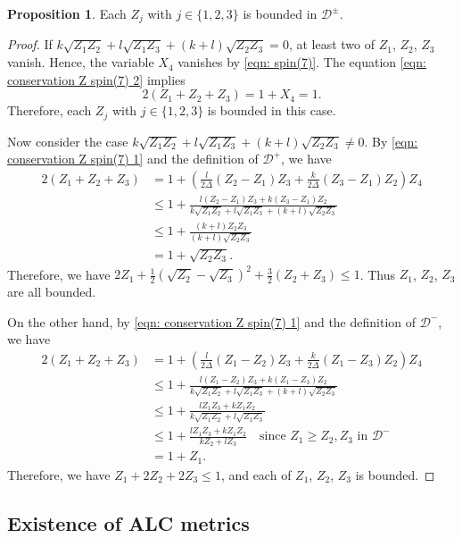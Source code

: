 \documentclass[11pt,letterpaper]{amsart}
\theoremstyle{definition}
\newtheorem{proposition}[theorem]{Proposition}
\numberwithin{equation}{section}
\begin{document}
\begin{proposition}
\label{prop: bounded Z1Z2Z3}
Each $Z_j$ with $j\in\{1,2,3\}$ is bounded in $\mathcal{D}^\pm$. 
\end{proposition}
\begin{proof}
If $k\sqrt{Z_1Z_2}+l\sqrt{Z_1Z_3}+(k+l)\sqrt{Z_2Z_3}=0$, at least two of $Z_1$, $Z_2$, $Z_3$ vanish. Hence, the variable $X_4$ vanishes by \eqref{eqn: spin(7)}. The equation \eqref{eqn: conservation Z spin(7) 2} implies
$$2(Z_1+Z_2+Z_3)=1+X_4=1.
$$
Therefore, each $Z_j$ with $j\in\{1,2,3\}$ is bounded in this case.

Now consider the case $k\sqrt{Z_1Z_2}+l\sqrt{Z_1Z_3}+(k+l)\sqrt{Z_2Z_3}\neq 0$.
By \eqref{eqn: conservation Z spin(7) 1} and the definition of $\mathcal{D}^+$, we have
\begin{equation}
\begin{split}
2(Z_1+Z_2+Z_3)&=1+\left(\frac{l}{2\Delta}(Z_2-Z_1)Z_3+\frac{k}{2\Delta}(Z_3-Z_1)Z_2\right)Z_4\\
&\leq 1+\frac{l(Z_2-Z_1)Z_3+k(Z_3-Z_1)Z_2}{k\sqrt{Z_1Z_2}+l\sqrt{Z_1Z_3}+(k+l)\sqrt{Z_2Z_3}}\\
&\leq 1+\frac{(k+l)Z_2Z_3}{(k+l)\sqrt{Z_2Z_3}}\\
&= 1+\sqrt{Z_2Z_3}.
\end{split}
\end{equation}
Therefore, we have $2Z_1+\frac{1}{2}(\sqrt{Z_2}-\sqrt{Z_3})^2+\frac{3}{2}(Z_2+Z_3)\leq 1$. Thus $Z_1$, $Z_2$, $Z_3$ are all bounded. 

On the other hand, by \eqref{eqn: conservation Z spin(7) 1} and the definition of $\mathcal{D}^-$, we have
\begin{equation}
\begin{split}
2(Z_1+Z_2+Z_3)&=1+\left(\frac{l}{2\Delta}(Z_1-Z_2)Z_3+\frac{k}{2\Delta}(Z_1-Z_3)Z_2\right)Z_4\\
&\leq 1+\frac{l(Z_1-Z_2)Z_3+k(Z_1-Z_3)Z_2}{k\sqrt{Z_1Z_2}+l\sqrt{Z_1Z_3}+(k+l)\sqrt{Z_2Z_3}}\\
&\leq 1+\frac{lZ_1Z_3+kZ_1Z_2}{k\sqrt{Z_1Z_2}+l\sqrt{Z_1Z_3}}\\
&\leq 1+\frac{lZ_1Z_3+kZ_1Z_2}{kZ_2+lZ_3}\quad \text{since $Z_1\geq Z_2,Z_3$ in $\mathcal{D}^-$}\\
&= 1+Z_1.
\end{split}
\end{equation}
Therefore, we have $Z_1+2Z_2+2Z_3\leq 1$, and each of $Z_1$, $Z_2$, $Z_3$ is bounded. 
\end{proof}


\subsection{Existence of ALC metrics}
\end{document}
